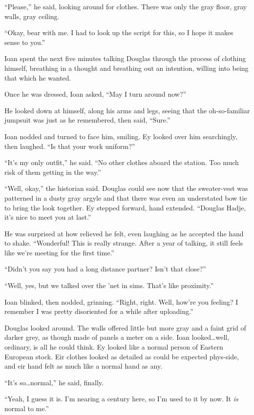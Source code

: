 ``Please,'' he said, looking around for clothes. There was only the gray floor, gray walls, gray ceiling.

``Okay, bear with me. I had to look up the script for this, so I hope it makes sense to you.''

Ioan spent the next five minutes talking Douglas through the process of clothing himself, breathing in a thought and breathing out an intention, willing into being that which he wanted.

Once he was dressed, Ioan asked, ``May I turn around now?''

He looked down at himself, along his arms and legs, seeing that the oh-so-familiar jumpsuit was just as he remembered, then said, ``Sure.''

Ioan nodded and turned to face him, smiling. Ey looked over him searchingly, then laughed. ``Is that your work uniform?''

``It's my only outfit,'' he said. ``No other clothes aboard the station. Too much risk of them getting in the way.''

``Well, okay,'' the historian said. Douglas could see now that the sweater-vest was patterned in a dusty gray argyle and that there was even an understated bow tie to bring the look together. Ey stepped forward, hand extended. ``Douglas Hadje, it's nice to meet you at last.''

He was surprised at how relieved he felt, even laughing as he accepted the hand to shake. ``Wonderful! This is really strange. After a year of talking, it still feels like we're meeting for the first time.''

``Didn't you say you had a long distance partner? Isn't that close?''

``Well, yes, but we talked over the 'net in sims. That's like proximity.''

Ioan blinked, then nodded, grinning. ``Right, right. Well, how're you feeling? I remember I was pretty disoriented for a while after uploading.''

Douglas looked around. The walls offered little but more gray and a faint grid of darker grey, as though made of panels a meter on a side. Ioan looked\ldots well, ordinary, is all he could think. Ey looked like a normal person of Eastern European stock. Eir clothes looked as detailed as could be expected phys-side, and eir hand felt as much like a normal hand as any.

``It's so\ldots normal,'' he said, finally.

``Yeah, I guess it is. I'm nearing a century here, so I'm used to it by now. It \emph{is} normal to me.''


